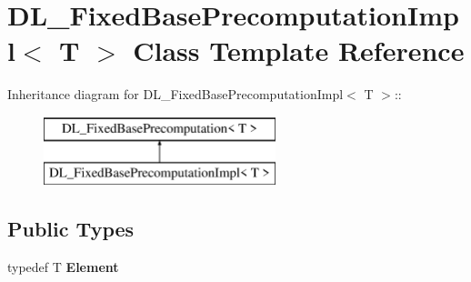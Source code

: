 \hypertarget{class_d_l___fixed_base_precomputation_impl}{
\section{DL\_\-FixedBasePrecomputationImpl$<$ T $>$ Class Template Reference}
\label{class_d_l___fixed_base_precomputation_impl}
}
Inheritance diagram for DL\_\-FixedBasePrecomputationImpl$<$ T $>$::\begin{figure}[H]
\begin{center}
\leavevmode
\includegraphics[height=2cm]{class_d_l___fixed_base_precomputation_impl}
\end{center}
\end{figure}
\subsection*{Public Types}
\begin{DoxyCompactItemize}
\item 
\hypertarget{class_d_l___fixed_base_precomputation_impl_a71b1da041ab718df3f7e3ee95d84727d}{
typedef T {\bfseries Element}}
\label{class_d_l___fixed_base_precomputation_impl_a71b1da041ab718df3f7e3ee95d84727d}

\end{DoxyCompactItemize}
